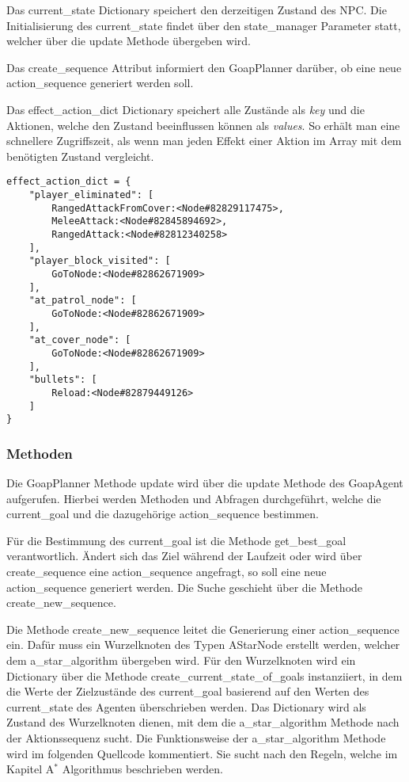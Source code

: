 Das current\_state Dictionary speichert den derzeitigen Zustand des NPC. Die Initialisierung des current\_state findet über den state\_manager Parameter statt, welcher über die update Methode übergeben wird.

Das create\_sequence Attribut informiert den GoapPlanner darüber, ob eine neue action\_sequence generiert werden soll.

Das effect\_action\_dict Dictionary speichert alle Zustände als \textit{key} und die Aktionen, welche den Zustand beeinflussen können als \textit{values}. So erhält man eine schnellere Zugriffszeit, als wenn man jeden Effekt einer Aktion im Array mit dem benötigten Zustand vergleicht.

\begin{lstlisting}[language=dict, caption={effect\_action\_dict aus der Implementierung}]
effect_action_dict = {
    "player_eliminated": [
        RangedAttackFromCover:<Node#82829117475>,
        MeleeAttack:<Node#82845894692>,
        RangedAttack:<Node#82812340258>
    ],
    "player_block_visited": [
        GoToNode:<Node#82862671909>
    ],
    "at_patrol_node": [
        GoToNode:<Node#82862671909>
    ],
    "at_cover_node": [
        GoToNode:<Node#82862671909>
    ],
    "bullets": [
        Reload:<Node#82879449126>
    ]
}
\end{lstlisting}


\subsubsection{Methoden}

Die GoapPlanner Methode update wird über die update Methode des GoapAgent aufgerufen. Hierbei werden Methoden und Abfragen durchgeführt, welche die current\_goal und die dazugehörige action\_sequence bestimmen. 

Für die Bestimmung des current\_goal ist die Methode get\_best\_goal verantwortlich. Ändert sich das Ziel während der Laufzeit oder wird über create\_sequence eine action\_sequence angefragt, so soll eine neue action\_sequence generiert werden. Die Suche geschieht über die Methode create\_new\_sequence. 

%

Die Methode create\_new\_sequence leitet die Generierung einer action\_sequence ein. Dafür muss ein Wurzelknoten des Typen AStarNode erstellt werden, welcher dem a\_star\_algorithm übergeben wird. Für den Wurzelknoten wird ein Dictionary über die Methode create\_current\_state\_of\_goals instanziiert, in dem die Werte der Zielzustände des current\_goal basierend auf den Werten des current\_state des Agenten überschrieben werden. Das Dictionary wird als Zustand des Wurzelknoten dienen, mit dem die a\_star\_algorithm Methode nach der Aktionssequenz sucht. Die Funktionsweise der a\_star\_algorithm Methode wird im folgenden Quellcode kommentiert. Sie sucht nach den Regeln, welche im Kapitel A$^*$ Algorithmus beschrieben werden.

